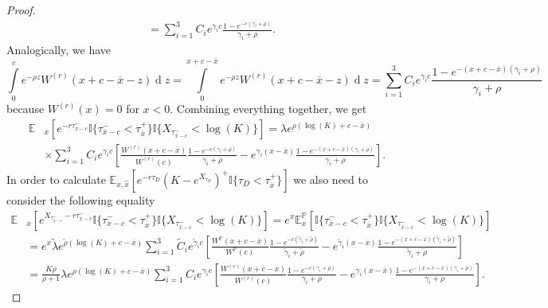 \documentclass[10pt,a4paper]{amsart}
\def\E{{\mathbb{E}}}
\def\Eq{{\mathbb{E}
		_{x,\hat{x}}}}
\def\P{{\mathbb{P}}}
\def \R{{{\rm I{\!}\rm R}}}
\def \I{{\mathbb{I}}}
\newcommand{\dx}{\operatorname{d}\!}
\def\P{{\mathbb P}} \def\le{\left} \def\ri{\right} \def\i{\infty}
\def\E{{\mathbb E}} \def\PP{\mc P} \def\Z{{\mathbb Z}} \def\R{{\mathbb R}}
\begin{document}
\begin{proof}
\begin{align*}
				\nonumber & = \sum_{i=1}^3 C_i e^{\gamma_i c} \frac{1 - e^{-c(\gamma_i+\rho)}}{\gamma_i + \rho}.
			\end{align*}
			Analogically, we have
			\begin{equation*}
				\int\limits_{0}^{c} e^{-\rho z} W^{(r)}(x+c-\overline{x}-z) \dx z = \int\limits_{0}^{x+c-\overline{x}} e^{-\rho z} W^{(r)}(x+c-\overline{x}-z) \dx z = \sum_{i=1}^3 C_i e^{\gamma_i c} \frac{1 - e^{-(x+c-\overline{x})(\gamma_i+\rho)}}{\gamma_i + \rho}
			\end{equation*}
			because $W^{(r)}(x) = 0$ for $x < 0$. Combining everything together, we get
			\begin{align*}
				\E&_x \left[ e^{-r\tau_{\overline{x}-c}^- }
				\I \{ \tau_{\overline{x}-c}^- < \tau_{\overline{x}}^+ \}
				\I \{ X_{\tau_{\overline{x}-c}^- } < \log(K)\}
				\right] = \lambda e^{\rho (\log(K)+c - \overline{x})} \\
				\nonumber &\times \sum_{i=1}^3 C_i e^{\gamma_i c} \left[ \frac{W^{(r)}(x+c-\overline{x})}{W^{(r)}(c)}\frac{1 - e^{-c(\gamma_i+\rho)}}{\gamma_i + \rho} - e^{\gamma_i(x - \overline{x})}\frac{1 - e^{-(x+c-\overline{x})(\gamma_i+\rho)}}{\gamma_i + \rho} \right].
			\end{align*}
			In order to calculate $\Eq\left[ e^{-r\tau_D} \left( K - e^{X_{\tau_D}} \right)^+ \I
			\{ \tau_D < \tau_{\overline{x}}^+ \} \right]$ we also need to consider the following equality
			\begin{align*}
				\E&_x \left[ e^{X_{\tau_{\overline{x}-c}^- }-r\tau_{\overline{x}-c}^- }
				\I \{ \tau_{\overline{x}-c}^- < \tau_{\overline{x}}^+ \}
				\I \{ X_{\tau_{\overline{x}-c}^- } < \log(K)\}
				\right] = e^x\E^\P_x \left[
				\I \{ \tau_{\overline{x}-c}^- < \tau_{\overline{x}}^+ \}
				\I \{ X_{\tau_{\overline{x}-c}^- } < \log(K)\}
				\right] \\
				&= e^x\tilde{\lambda} e^{\tilde{\rho} (\log(K)+c - \overline{x})} \sum_{i=1}^3 \tilde{C}_i e^{\tilde{\gamma}_i c} \left[ \frac{W^{\P}(x+c-\overline{x})}{W^{\P}(c)}\frac{1 - e^{-c(\tilde{\gamma}_i+\tilde{\rho})}}{\tilde{\gamma}_i + \tilde{\rho}} - e^{\tilde{\gamma}_i(x - \overline{x})}\frac{1 - e^{-(x+c-\overline{x})(\tilde{\gamma}_i+\tilde{\rho})}}{\tilde{\gamma}_i + \tilde{\rho}} \right] \\
				& = \frac{K\rho}{\rho + 1} \lambda e^{\rho (\log(K)+c - \overline{x})} \sum_{i=1}^3 C_i e^{\gamma_i c} \left[ \frac{W^{(r)}(x+c-\overline{x})}{W^{(r)}(c)}\frac{1 - e^{-c(\gamma_i+\rho)}}{\gamma_i + \rho} - e^{\gamma_i(x - \overline{x})}\frac{1 - e^{-(x+c-\overline{x})(\gamma_i+\rho)}}{\gamma_i + \rho} \right].

\end{align*}
\end{proof}
\end{document}

